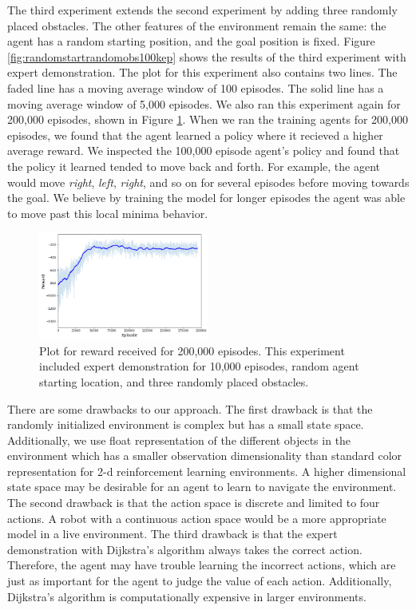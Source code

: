 \documentclass[conference]{IEEEtran}
\begin{document}
The third experiment extends the second experiment by adding three randomly
placed obstacles. The other features of the environment remain the same: the
agent has a random starting position, and the goal position is fixed. Figure
\ref{fig:randomstartrandomobs100kep} shows the results of the third experiment
with expert demonstration. The plot for this experiment also contains two lines.
The faded line has a moving average window of 100 episodes. The solid line has a
moving average window of 5,000 episodes. We also ran this experiment again for
200,000 episodes, shown in Figure \ref{fig:randomstartrandomobs200kep}. When we
ran the training agents for 200,000 episodes, we found that the agent learned a
policy where it recieved a higher average reward. We inspected the 100,000
episode agent's policy and found that the policy it learned tended to move back
and forth. For example, the agent would move \textit{right}, \textit{left},
\textit{right}, and so on for several episodes before moving towards the goal.
We believe by training the model for longer episodes the agent was able to move
past this local minima behavior.

\begin{figure}
    \centering
    \includegraphics[width=0.5\textwidth]{assets/randomstartrandomobs200kep.png}
    \caption{Plot for reward received for 200,000 episodes. This experiment
        included expert demonstration for 10,000 episodes, random agent starting
        location, and three randomly placed obstacles.}
    \label{fig:randomstartrandomobs200kep}
\end{figure}

There are some drawbacks to our approach. The first drawback is that the
randomly initialized environment is complex but has a small state space.
Additionally, we use float representation of the different objects in the
environment which has a smaller observation dimensionality than standard color
representation for 2-d reinforcement learning environments. A higher dimensional
state space may be desirable for an agent to learn to navigate the environment.
The second drawback is that the action space is discrete and limited to four
actions. A robot with a continuous action space would be a more appropriate
model in a live environment. The third drawback is that the expert demonstration
with Dijkstra's algorithm always takes the correct action. Therefore, the agent
may have trouble learning the incorrect actions, which are just as important for
the agent to judge the value of each action. Additionally, Dijkstra's algorithm
is computationally expensive in larger environments.
\end{document}
